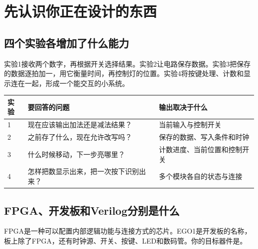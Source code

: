\section{先认识你正在设计的东西}
\subsection{四个实验各增加了什么能力}
实验1接收两个数字，再根据开关选择结果。实验2让电路保存数据。实验3把保存的数据逐拍加一，用它衡量时间，再控制灯的位置。实验4将按键处理、计数和显示连在一起，形成一个能交互的小系统。

\begin{center}
\end{center}

\begin{center}
\begin{tabularx}{\linewidth}{@{}lXX@{}}\toprule
实验 & 要回答的问题 & 输出取决于什么\\\midrule
1 & 现在应该输出加法还是减法结果？ & 当前输入与控制开关\\
2 & 之前存了什么，现在允许改写吗？ & 保存的数据、写入条件和时钟\\
3 & 什么时候移动，下一步亮哪里？ & 计数进度、当前位置和控制开关\\
4 & 怎样把数显示出来，把一次按下识别出来？ & 多个模块各自的状态与连接\\\bottomrule
\end{tabularx}
\end{center}

\subsection{FPGA、开发板和Verilog分别是什么}
FPGA是一种可以配置内部逻辑功能与连接方式的芯片。EGO1是开发板的名称，板上除了FPGA，还有时钟源、开关、按键、LED和数码管。你的目标器件是。

